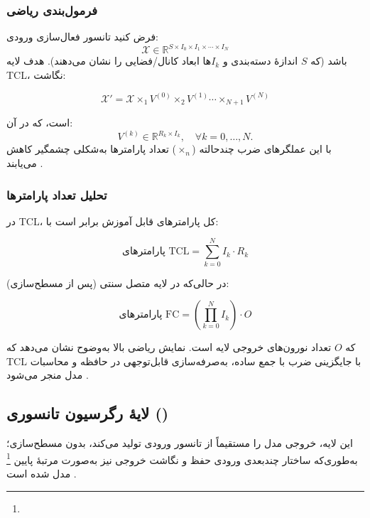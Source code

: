 \subsubsection*{فرمول‌بندی ریاضی}

فرض کنید تانسور فعال‌سازی ورودی:
\[
\mathcal{X} \in \mathbb{R}^{S \times I_0 \times I_1 \times \cdots \times I_N}
\]
باشد (که \(S\) اندازهٔ دسته‌بندی و \(I_k\)ها ابعاد کانال/فضایی را نشان می‌دهند). هدف لایه TCL، نگاشت:

\begin{equation}
	\mathcal{X}' = \mathcal{X} \times_1 V^{(0)} \times_2 V^{(1)} \cdots \times_{N+1} V^{(N)}
\end{equation}


است، که در آن:
\[
V^{(k)} \in \mathbb{R}^{R_k \times I_k}, \quad \forall k = 0,\dots,N.
\]
با این عملگرهای ضرب چندحالته (\(\times_n\)) تعداد پارامترها به‌شکلی چشمگیر کاهش می‌یابند \cite{kossaifi2017tensorcontraction}.







\subsubsection*{تحلیل تعداد پارامترها}

در TCL، کل پارامترهای قابل آموزش برابر است با:

\begin{equation}
	\text{پارامترهای TCL} = \sum_{k=0}^{N} I_k \cdot R_k
\end{equation}




در حالی‌که در لایه متصل سنتی (پس از مسطح‌سازی):


\begin{equation}
	\text{پارامترهای FC} = \left(\prod_{k=0}^{N} I_k\right) \cdot O
\end{equation}


که \(O\) تعداد نورون‌های خروجی لایه است. نمایش ریاضی بالا به‌وضوح نشان می‌دهد که TCL با جایگزینی ضرب با جمع ساده، به‌صرفه‌سازی قابل‌توجهی در حافظه و محاسبات مدل منجر می‌شود \cite{kossaifi2017tensorcontraction,kossaifi2020tensorregression}.

\subsection{لایهٔ رگرسیون تانسوری ()}

این لایه، خروجی مدل را مستقیماً از تانسور ورودی تولید می‌کند، بدون مسطح‌سازی؛ به‌طوری‌که ساختار چندبعدی ورودی حفظ و نگاشت خروجی نیز به‌صورت مرتبۀ پایین \footnote{} مدل شده است \cite{kossaifi2020tensorregression}.


